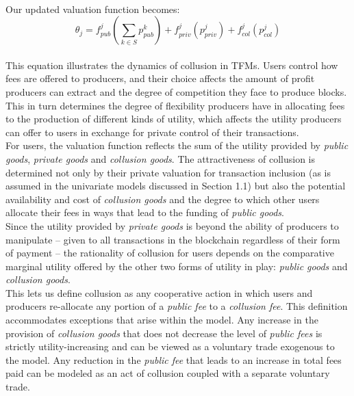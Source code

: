 \documentclass[11pt,a4paper]{llncs}
\begin{document}
\vspace{0.2cm} \\
Our updated valuation function becomes:
\vspace{0.2cm} \\
$$
\theta_j = f_{pub}^j\left(\sum_{k \in S} p_{pub}^{k}\right) + f_{priv}^j(p_{priv}^j) + f_{col}^j(p_{col}^j)
$$
\vspace{0.2cm} \\
This equation illustrates the dynamics of collusion in TFMs. Users control how fees are offered to producers, and their choice affects the amount of profit producers can extract and the degree of competition they face to produce blocks. This in turn determines the degree of flexibility producers have in allocating fees to the production of different kinds of utility, which affects the utility producers can offer to users in exchange for private control of their transactions.
\vspace{0.2cm} \\
For users, the valuation function reflects the sum of the utility provided by \textit{public goods}, \textit{private goods} and \textit{collusion goods}. The attractiveness of collusion is determined not only by their private valuation for transaction inclusion (as is assumed in the univariate models discussed in Section 1.1) but also the potential availability and cost of \textit{collusion goods} and the degree to which other users allocate their fees in ways that lead to the funding of \textit{public goods}.
\vspace{0.2cm} \\
Since the utility provided by \textit{private goods} is beyond the ability of producers to manipulate -- given to all transactions in the blockchain regardless of their form of payment -- the rationality of collusion for users depends on the comparative marginal utility offered by the other two forms of utility in play: \textit{public goods} and \textit{collusion goods}.
\vspace{0.2cm} \\
This lets us define collusion as any cooperative action in which users and producers re-allocate any portion of a \textit{public fee} to a \textit{collusion fee}. This definition accommodates exceptions that arise within the model. Any increase in the provision of \textit{collusion goods} that does not decrease the level of \textit{public fees} is strictly utility-increasing and can be viewed as a voluntary trade exogenous to the model. Any reduction in the \textit{public fee} that leads to an increase in total fees paid can be modeled as an act of collusion coupled with a separate voluntary trade.
\end{document}
